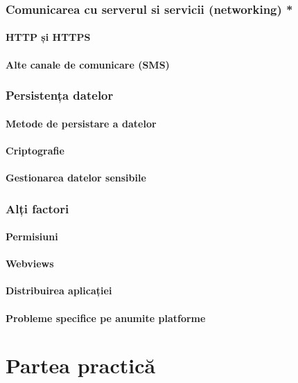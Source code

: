 \documentclass[a4paper]{article}
\begin{document}
\section{Comunicarea cu serverul si servicii (networking) *}
\subsection{HTTP și HTTPS}
\subsection{Alte canale de comunicare (SMS)}

\section{Persistența datelor}
\subsection{Metode de persistare a datelor}
\subsection{Criptografie}
\subsection{Gestionarea datelor sensibile}

\section{Alți factori}
\subsection{Permisiuni}
\subsection{Webviews}
\subsection{Distribuirea aplicației}
\subsection{Probleme specifice pe anumite platforme}

\part{Partea practică}
\end{document}
